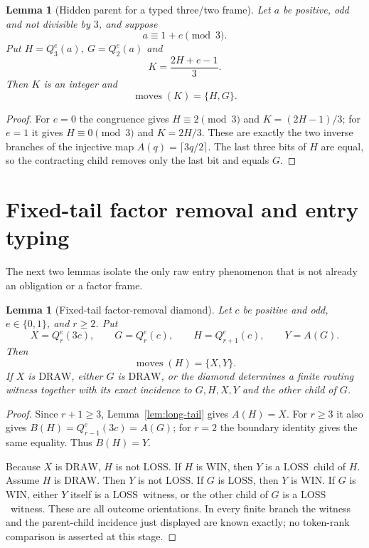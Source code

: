 \documentclass[11pt]{article}
\newtheorem{lemma}[theorem]{Lemma}
\newcommand{\WIN}{\ensuremath{\mathrm{WIN}}}
\newcommand{\LOSS}{\ensuremath{\mathrm{LOSS}}}
\newcommand{\DRAW}{\ensuremath{\mathrm{DRAW}}}
\newcommand{\Moves}{\operatorname{moves}}
\begin{document}
\begin{lemma}[Hidden parent for a typed three/two frame]\label{lem:hidden-parent}
Let $a$ be positive, odd and not divisible by $3$, and suppose
\[
  a\equiv1+e\pmod3.
\]
Put $H=Q_3^e(a)$, $G=Q_2^e(a)$ and
\[
  K=\frac{2H+e-1}{3}.
\]
Then $K$ is an integer and
\[
  \Moves(K)=\{H,G\}.
\]
\end{lemma}

\begin{proof}
For $e=0$ the congruence gives $H\equiv2\pmod3$ and
$K=(2H-1)/3$; for $e=1$ it gives $H\equiv0\pmod3$ and $K=2H/3$.
These are exactly the two inverse branches of the injective map
$A(q)=\lceil3q/2\rceil$. The last three bits of $H$ are equal, so the
contracting child removes only the last bit and equals $G$.
\end{proof}

\section{Fixed-tail factor removal and entry typing}

The next two lemmas isolate the only raw entry phenomenon that is not already
an obligation or a factor frame.

\begin{lemma}[Fixed-tail factor-removal diamond]\label{lem:fixed-tail-factor}
Let $c$ be positive and odd, $e\in\{0,1\}$, and $r\ge2$. Put
\[
  X=Q_r^e(3c),\qquad G=Q_r^e(c),\qquad H=Q_{r+1}^e(c),\qquad Y=A(G).
\]
Then
\[
  \Moves(H)=\{X,Y\}.
\]
If $X$ is \DRAW, either $G$ is \DRAW, or the diamond determines a finite
routing witness together with its exact incidence to $G,H,X,Y$ and the other
child of $G$.
\end{lemma}

\begin{proof}
Since $r+1\ge3$, Lemma~\ref{lem:long-tail} gives $A(H)=X$. For $r\ge3$ it
also gives $B(H)=Q_{r-1}^e(3c)=A(G)$; for $r=2$ the boundary identity gives
the same equality. Thus $B(H)=Y$.

Because $X$ is \DRAW, $H$ is not \LOSS. If $H$ is \WIN, then $Y$ is a
\LOSS\ child of $H$. Assume $H$ is \DRAW. Then $Y$ is not \LOSS. If $G$ is
\LOSS, then $Y$ is \WIN. If $G$ is \WIN, either $Y$ itself is a \LOSS\
witness, or the other child of $G$ is a \LOSS\ witness. These are all outcome
orientations. In every finite branch the witness and the parent-child
incidence just displayed are known exactly; no token-rank comparison is
asserted at this stage.
\end{proof}
\end{document}

